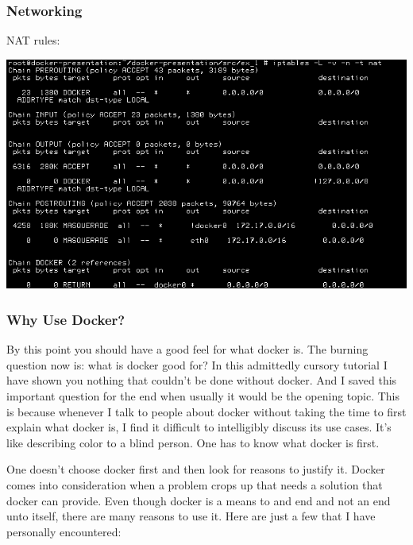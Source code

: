 \documentclass[helvetica,english,utf8,notitle,nologo]{beamer}
\begin{document}
\begin{frame}
  \frametitle{Networking}

  NAT rules:

  \includegraphics[scale=0.44]{image_27}
\end{frame}

\begin{frame}
  \frametitle{Why Use Docker?}

  By this point you should have a good feel for what docker is. The
  burning question now is: what is docker good for? In this admittedly
  cursory tutorial I have shown you nothing that couldn't be done
  without docker. And I saved this important question for the end when
  usually it would be the opening topic. This is because whenever I
  talk to people about docker without taking the time to first explain
  what docker is, I find it difficult to intelligibly discuss its use
  cases. It's like describing color to a blind person. One has to know
  what docker is first.

  One doesn't choose docker first and then look for reasons to justify
  it. Docker comes into consideration when a problem crops up that
  needs a solution that docker can provide. Even though docker is a
  means to and end and not an end unto itself, there are many reasons
  to use it. Here are just a few that I have personally encountered:
\end{frame}
\end{document}
